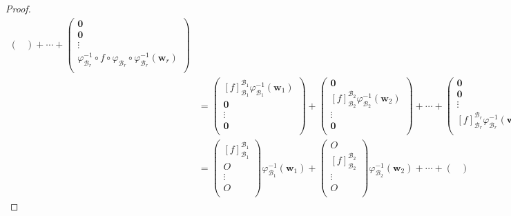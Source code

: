 \documentclass[dvipdfmx]{jsarticle}
\begin{document}
\begin{proof}
\begin{align*}
\begin{pmatrix}
\end{pmatrix} + \cdots + \begin{pmatrix}
\mathbf{0} \\
\mathbf{0} \\
 \vdots \\
\varphi_{\mathcal{B}_{r}}^{- 1} \circ f \circ \varphi_{\mathcal{B}_{r}} \circ \varphi_{\mathcal{B}_{r}}^{- 1}\left( \mathbf{w}_{r} \right) \\
\end{pmatrix}\\
&= \begin{pmatrix}
[ f]_{\mathcal{B}_{1}}^{\mathcal{B}_{1}}\varphi_{\mathcal{B}_{1}}^{- 1}\left( \mathbf{w}_{1} \right) \\
\mathbf{0} \\
 \vdots \\
\mathbf{0} \\
\end{pmatrix} + \begin{pmatrix}
\mathbf{0} \\
[ f]_{\mathcal{B}_{2}}^{\mathcal{B}_{2}}\varphi_{\mathcal{B}_{2}}^{- 1}\left( \mathbf{w}_{2} \right) \\
 \vdots \\
\mathbf{0} \\
\end{pmatrix} + \cdots + \begin{pmatrix}
\mathbf{0} \\
\mathbf{0} \\
 \vdots \\
[ f]_{\mathcal{B}_{r}}^{\mathcal{B}_{r}}\varphi_{\mathcal{B}_{r}}^{- 1}\left( \mathbf{w}_{r} \right) \\
\end{pmatrix}\\
&= \begin{pmatrix}
[ f]_{\mathcal{B}_{1}}^{\mathcal{B}_{1}} \\
O \\
 \vdots \\
O \\
\end{pmatrix}\varphi_{\mathcal{B}_{1}}^{- 1}\left( \mathbf{w}_{1} \right) + \begin{pmatrix}
O \\
[ f]_{\mathcal{B}_{2}}^{\mathcal{B}_{2}} \\
 \vdots \\
O \\
\end{pmatrix}\varphi_{\mathcal{B}_{2}}^{- 1}\left( \mathbf{w}_{2} \right) + \cdots + \begin{pmatrix}

\end{pmatrix}
\end{align*}
\end{proof}
\end{document}
